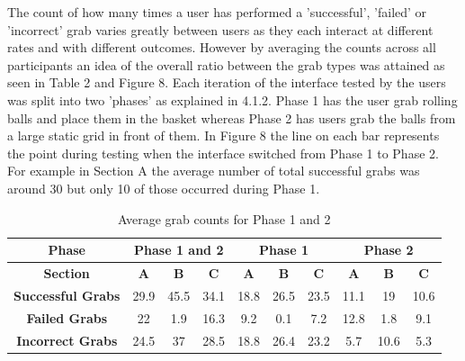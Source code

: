 \documentclass[12pt]{article}
\begin{document}
The count of how many times a user has performed a 'successful', 'failed' or 'incorrect' grab varies greatly between users as they each interact at different rates and with different outcomes. However by averaging the counts across all participants an idea of the overall ratio between the grab types was attained as seen in Table 2 and Figure 8. Each iteration of the interface tested by the users was split into two 'phases' as explained in 4.1.2. Phase 1 has the user grab rolling balls and place them in the basket whereas Phase 2 has users grab the balls from a large static grid in front of them. In Figure 8 the line on each bar represents the point during testing when the interface switched from Phase 1 to Phase 2. For example in Section A the average number of total successful grabs was around 30 but only 10 of those occurred during Phase 1.

\begin{table}
\centering
\vspace{1cm}\begin{tabular}{ |c|c|c|c|c|c|c|c|c|c| }
 	\hline
 	\textbf{Phase} & \multicolumn{3}{|c|}{\textbf{Phase 1 and 2}} &  \multicolumn{3}{|c|}{\textbf{Phase 1}} & \multicolumn{3}{|c|}{\textbf{Phase 2}} \\
 	\hline
	\textbf{Section} & \textbf{A} & \textbf{B} & \textbf{C} & \textbf{A} & \textbf{B} & \textbf{C} & \textbf{A} & \textbf{B} & \textbf{C} \\
	\hline
	\textbf{Successful Grabs} & 29.9 & 45.5 & 34.1 & 18.8 & 26.5 & 23.5 & 11.1 & 19 & 10.6 \\
	\hline
	\textbf{Failed Grabs} & 22 & 1.9 & 16.3 & 9.2 & 0.1 & 7.2 & 12.8 & 1.8 & 9.1 \\
	\hline
	\textbf{Incorrect Grabs} & 24.5 & 37 & 28.5 & 18.8 & 26.4 & 23.2 & 5.7 & 10.6 & 5.3 \\
	\hline
\end{tabular}
\caption{Average grab counts for Phase 1 and 2}
\end{table}
\end{document}
